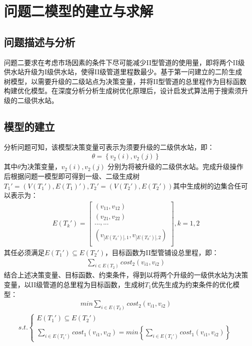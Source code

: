 \documentclass{whutmod}
\begin{document}
	\section{问题二模型的建立与求解}
		\subsection{问题描述与分析}	
			问题二要求在考虑市场因素的条件下尽可能减少II型管道的使用量，即将两个II级供水站升级为I级供水站，使得II级管道里程数最少。基于第一问建立的二阶生成树模型，以需要升级的二级站点为决策变量，并将II型管道的总里程作为目标函数构建优化模型。在深度分析分析生成树优化原理后，设计启发式算法用于搜索须升级的二级供水站。
			\subsection{模型的建立}
			分析问题可知，该模型决策变量可表示为须要升级的二级供水站，即：
				\begin{gather}
				\theta =\left \{ v_2(i),v_2(j) \right \}
				\end{gather}
			其中$\theta$为决策变量，$v_2(i),v_2(j)$ 分别为将被升级的二级供水站。完成升级操作后根据问题一模型即可得到一级、二级生成树$T_{1}'=(V(T_{1}'),E(T_{1})'),T_{2}'=(V(T_{2}'),E(T_{2}'))$其中生成树的边集合任可以表示为：
			\begin{gather}
			E(T_k')=
		\begin{bmatrix}
		(v_{11} ,v_{12}) \\ 
		(v_{21} ,v_{22} )\\ 
		...,...\\
		(v_{|E(T_k')|,1},v_{|E(T_k')|,2})\\
		\end{bmatrix},k=1,2
			\end{gather}
			其任必须满足$E(T_1')\subseteq E(T_2')$，目标函数为II型管铺设总里程，即：
			\begin{gather}
			\sum_{i\in E(T_2) }cost_2(v_{i1},v_{i2})
			\end{gather}
			结合上述决策变量、目标函数、约束条件，得到以将两个升级的一级供水站为决策变量，以II级管道的总里程为目标函数，生成树$T_1$优先生成为约束条件的优化模型：
			\begin{gather}
			min  \sum_{i\in E(T_2) }cost_2(v_{i1},v_{i2})
			\end{gather}
			\begin{gather*}
			s.t.\left\{\begin{matrix}
			E(T_{1}')\subseteq  E(T_{2}')\\ 
			\sum_{i\in E(T_1') }cost_1(v_{i1},v_{i2})=min\left \{ 	\sum_{i\in E(T_1') }cost_1(v_{i1},v_{i2}) \right \} 
			\end{matrix}\right.
			\end{gather*}
\end{document}
